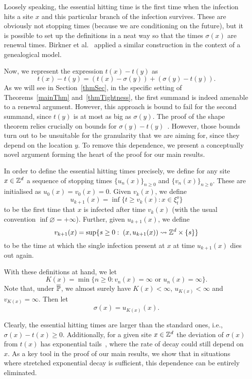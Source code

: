 Loosely speaking, the essential hitting time is the first time when the infection hits a site $x$ and this particular branch of the infection survives. These are obviously not stopping times (because we are conditioning on the future), but it is possible to set up the definitions in a neat way so that the times $\sigma(x)$ are renewal times. Birkner et al.\ \cite{BirknCernyDeppeGante13} applied a similar construction in the context of a genealogical model. 

Now, we represent the expression $t(x) - t(y)$ as
$$t(x) - t(y) = (t(x) - \sigma(y)) + (\sigma(y) - t(y)).$$
As we will see in Section~\ref{thmSec}, in the specific setting of Theorems~\ref{mainThm} and~\ref{thmTightness}, the first summand is indeed amenable to a renewal argument. However, this approach is bound to fail for the second summand, since $t(y)$ is at most as big as $\sigma(y)$. The proof of the shape theorem relies crucially on bounds for $\sigma(y) - t(y)$~\cite[Proposition 17]{GaretMarch12}. However, those bounds turn out to be unsuitable for the granularity that we are aiming for, since they depend on the location $y$. To remove this dependence, we present a conceptually novel argument forming the heart of the proof for our main results.


In order to define the essential hitting times precisely, we define for any site $x\in{\mathbb{Z}^d}$ a sequence of stopping times $\{u_n(x)\}_{n \ge 0}$ and $\{v_n(x)\}_{n \ge 0}$. 
These are initialised as $u_0(x)=v_0(x)=0$. 
Given $v_k(x)$, we define 
\[u_{k+1}(x)=\inf\{t\ge v_k(x):x\in\xi^o_t\}\]
to be the first time that $x$ is infected after time $v_k(x)$ (with the usual convention $\inf\varnothing=+\infty$). 
Further, given $u_{k+1}(x)$, we define 
\[v_{k+1}(x)=\sup\{s\ge0:\; (x,u_{k+1}(x)) \rightsquigarrow {\mathbb{Z}^d} \times \{s\}\} \]
to be the time at which the single infection present at $x$ at time $u_{k+1}(x)$ dies out again. 

With these definitions at hand, we let 
\[K(x)=\min\{n\ge0:v_n(x)=\infty\text{ or }u_n(x)=\infty\}.\]
Note that, under $\overline{\mathbb{P}}$, we almost surely have $K(x) < \infty$, $u_{K(x)} < \infty$ and $v_{K(x)} = \infty$. Then let 
\[\sigma(x)=u_{K(x)}(x).\]


Clearly, the essential hitting times are larger than the standard ones, i.e., $\sigma(x) - t(x) \ge 0$. Additionally, for a given site $x \in {\mathbb{Z}^d}$ the deviation of $\sigma(x)$ from $t(x)$ has exponential tails~\cite[Proposition 17]{GaretMarch12}, where the rate of decay could still depend on $x$. As a key tool in the proof of our main results, we show that in situations where stretched exponential decay is sufficient, this dependence can be entirely eliminated. 


